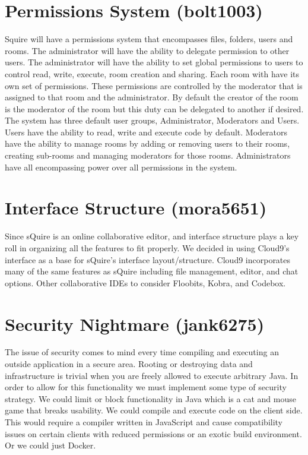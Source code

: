 \documentclass[11pt]{report}
\begin{document}
\section{Permissions System (bolt1003)}
    Squire will have a permissions system that encompasses files, folders, users and rooms. The administrator will have the ability to delegate permission to other users.  The administrator will have the ability to set global permissions to users to control read, write, execute, room creation and sharing.  Each room with have its own set of permissions. These permissions are controlled by the moderator that is assigned to that room and the administrator. By default the creator of the room is the moderator of the room but this duty can be delegated to another if desired. The system has three default user groups, Administrator, Moderators and Users. Users have the ability to read, write and execute code by default. Moderators have the ability to manage rooms by adding or removing users to their rooms, creating sub-rooms and managing moderators for those rooms. Administrators have all encompassing power over all permissions in the system.

\section{Interface Structure (mora5651)}
    Since sQuire is an online collaborative editor, and interface structure plays a key roll in organizing all the features to fit properly. We decided in using Cloud9's interface as a base for sQuire's interface layout/structure. Cloud9 incorporates many of the same features as sQuire including file management, editor, and chat options. Other collaborative IDEs to consider Floobits, Kobra, and Codebox. 
    
\section{Security Nightmare (jank6275)}
    The issue of security comes to mind every time compiling and executing an outside application in a secure area. Rooting or destroying data and infrastructure is trivial when you are freely allowed to execute arbitrary Java. In order to allow for this functionality we must implement some type of security strategy. We could limit or block functionality in Java which is a cat and mouse game that breaks usability. We could compile and execute code on the client side. This would require a compiler written in JavaScript and cause compatibility issues on certain clients with reduced permissions or an exotic build environment. Or we could just Docker.
\end{document}

